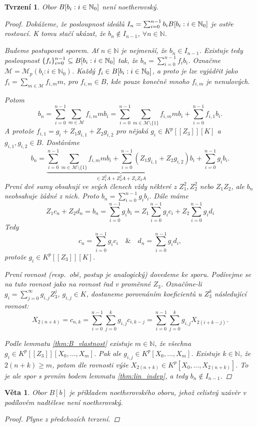 \documentclass[11pt,a4paper]{article}
\newcommand\m[1]{\mathbb { #1 }} %
\newcommand\p[1]{\mathcal{ #1 }} %
\newcommand\N{\m N}
\newcommand*{\mld}[1]{\[#1\]} %
\newcounter{numb}
\theoremstyle{definition}
\theoremstyle{plain}
\newtheorem{veta}[numb]{Věta}
\newtheorem{tvrzeni}[numb]{Tvrzení}
\begin{document}
\begin{tvrzeni}
	Obor $\Ball$ není noetherovský.
	
	\begin{proof}
		\newcommand*{\I}{_{i = 0}^{n - 1}}

		Dokážeme, že posloupnost ideálů $I_n = \sum\I b_i \Ball$ je ostře rostoucí. K tomu stačí ukázat, že $b_n \notin I_{n - 1}$, $\forall n \in \N$.

		Budeme postupovat sporem. Ať $n \in \N$ je nejmenší, že $b_n \in I_{n - 1}$. Existuje tedy posloupnost $\{f_i\}\I \subseteq \Ball$ tak, že $b_n = \sum\I f_i b_i$. Označme $\p M = \p M_p(b_i: i \in \N_0)$. Každý $f_i \in \Ball$, a proto je lze vyjádřit jako $f_i = \sum_{m \in \p M} f_{i, m} m$, pro $f_{i, m} \in B$, kde pouze konečně mnoho $f_{i, m}$ je nenulových.

		Potom
		\mld{
			b_n = \sum\I \sum_{m \in \p M} f_{i, m} m b_i = \sum\I \sum_{m \in \p M \setminus \{1\}} f_{i, m} m b_i + \sum\I f_{i, 1} b_i.
		}
		A protože $f_{i, 1} = g_i + Z_1 g_{i, 1} + Z_2 g_{i, 2}$ pro nějaká $g_i \in K^p[[Z_3]][K]$ a $g_{i, 1}, g_{i, 2} \in B$. Dostáváme
		\mld{
			b_n = \underbrace{\sum\I \sum_{m \in \p M \setminus \{1\}} f_{i, m} m b_i + \sum\I \left(Z_1 g_{i, 1} + Z_2 g_{i, 2}\right)b_i}_{\in Z_1^2 A + Z_2^2 A + Z_1 Z_2 A} + \sum\I g_i b_i.
		}
		První dvě sumy obsahují ve svých členech vždy některé z $Z_1^2, Z_2^2$ nebo
		$Z_1 Z_2$, ale $b_n$ neobsahuje žádné z nich. Proto $b_n = \sum\I g_i b_i$. Dále máme
		\mld{
			Z_1 c_n + Z_2 d_n = b_n = \sum\I g_i b_i = Z_1 \sum\I g_i c_i + Z_2 \sum\I g_i d_i
		}
		Tedy
		\mld{
			c_n = \sum\I g_i c_i \quad \& \quad d_n = \sum\I g_i d_i,
		}
		protože $g_i \in K^p[[Z_3]][K]$.

		První rovnost (resp.\ obě, postup je analogický) dovedeme ke sporu. Podívejme se na tuto rovnost jako na rovnost řad v proměnné $Z_3$. Označíme-li $g_i = \sum_{j = 0}^\infty g_{i, j} Z_3^j$, $g_{i, j} \in K$, dostaneme porovnáním koeficientů u $Z_3^k$ následující rovnost:
		\mld{
			X_{2(n + k)} = c_{n, k} = \sum\I \sum_{j = 0}^k g_{i, j} c_{i, k - j} = \sum\I \sum_{j = 0}^k g_{i, j} X_{2(i + k - j)}.
		}
		
		Podle lemmatu \ref{thm:B_vlastnost} existuje $m \in \N$, že všechna $g_i \in K^p[[Z_3]][X_0,\dots, X_m]$. Pak ale $g_{i, j} \in K^p[X_0,\dots, X_m]$. Existuje $k \in \N$, že $2(n + k) \geq m$, potom dle rovnosti výše $X_{2(n + k)} \in K^p[X_0,\dots, X_{2(n + k)}]$. To je ale spor s prvním bodem lemmatu \ref{thm:lin_indep}, a tedy $b_n \not\in I_{n-1}$.
	\end{proof}
\end{tvrzeni}

\begin{veta}
	Obor $B[b]$ je příkladem noetherovského oboru, jehož celistvý uzávěr v podílovém nadtělese není noetherovský.
	
	\begin{proof}
		Plyne z předchozích tvrzení.
	\end{proof}
\end{veta}
\end{document}
